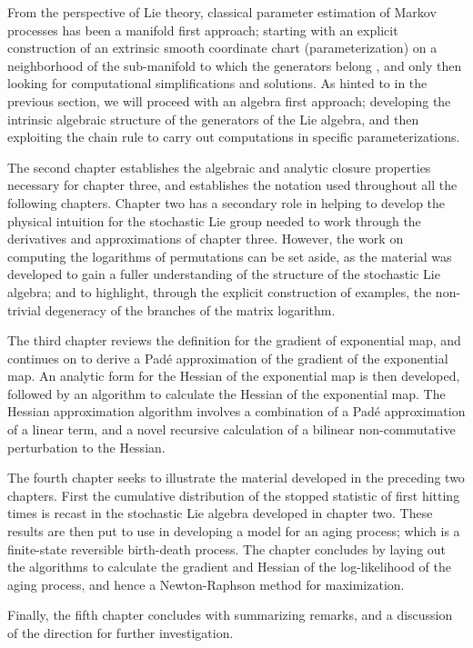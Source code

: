 From the perspective of Lie theory, classical parameter estimation of Markov processes has
been a manifold first approach; starting with an explicit construction of an extrinsic
smooth coordinate chart (parameterization) on a neighborhood of the sub-manifold to which
the generators belong \cite{sternberg_advanced_2014}, and only then looking for 
computational simplifications and solutions. As hinted to in the previous section, we will 
proceed with an algebra first approach; developing the intrinsic algebraic structure of the 
generators of the Lie algebra, and then exploiting the chain rule to carry out computations 
in specific parameterizations.

The second chapter establishes the algebraic and analytic closure properties necessary for 
chapter three, and establishes the notation used throughout all the following chapters.
Chapter two has a secondary role in helping to develop the physical intuition for the 
stochastic Lie group needed to work through the derivatives and approximations of chapter 
three. However, the work on computing the logarithms of permutations can be set aside, as 
the material was developed to gain a fuller understanding of the structure of the stochastic 
Lie algebra; and to highlight, through the explicit construction of examples, the
non-trivial degeneracy of the branches of the matrix logarithm.

The third chapter reviews the definition for the gradient of exponential map, and continues
on to derive a Pad\'{e} approximation of the gradient of the exponential map. An analytic
form for the Hessian of the exponential map is then developed, followed by an algorithm to 
calculate the Hessian of the exponential map. The Hessian approximation algorithm involves a 
combination of a Pad\'{e} approximation of a linear term, and a novel recursive calculation 
of a bilinear non-commutative perturbation to the Hessian.

The fourth chapter seeks to illustrate the material developed in the preceding two chapters.
First the cumulative distribution of the stopped statistic of first hitting times is recast 
in the stochastic Lie algebra developed in chapter two. These results are then put to use in
developing a model for an aging process; which is a finite-state reversible birth-death
process. The chapter concludes by laying out the algorithms to calculate the gradient and
Hessian of the log-likelihood of the aging process, and hence a Newton-Raphson method for
maximization.

Finally, the fifth chapter concludes with summarizing remarks, and a discussion of the
direction for further investigation.
